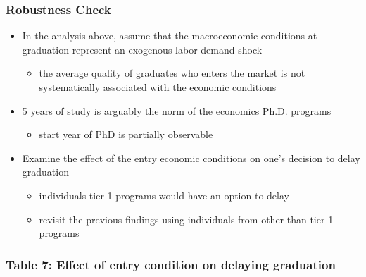 \documentclass[10pt,svgnames,fragile]{beamer}
\begin{document}
{\begin{frame}[label = robustness]
	\frametitle{Robustness Check}
	\begin{itemize}
		\item In the analysis above,  assume that the macroeconomic conditions at graduation represent an exogenous labor demand shock
		\begin{itemize}
			\vspace{1 mm}
			\item  the average quality of graduates who enters the market is not systematically associated with the economic conditions
		\end{itemize}
\vfill
		\item 5 years of study is arguably the norm of the economics Ph.D. programs	
		\begin{itemize}
			\vspace{1 mm}
			\item start year of PhD is partially observable
		\end{itemize}
\vfill
		\item Examine the effect of the entry economic conditions on one's decision to delay graduation %
		\begin{itemize}
			\vspace{1 mm}
			\item individuals tier 1 programs would have an option to delay 
			\vspace{1 mm}
			\item revisit the previous findings using individuals from other than tier 1 programs %
		\end{itemize}
\vfill
	\end{itemize}
\end{frame}


\begin{frame}
	\frametitle{Table 7: Effect of entry condition on delaying graduation}
	
\end{frame}
}
%	
\end{document}
